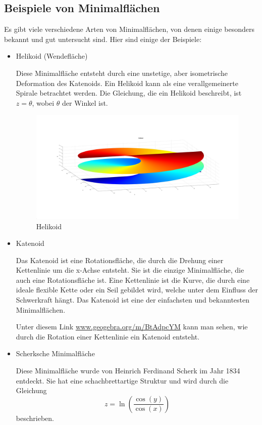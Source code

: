 \subsection{Beispiele von Minimalflächen
	\label{minimalflaechen:subsection:Beispiele von Minimalflächen}}
Es gibt viele verschiedene Arten von Minimalflächen, von denen einige besonders bekannt und gut untersucht sind.
Hier sind einige der Beispiele:
\begin{itemize}
	\item
	Helikoid (Wendefläche)
	
	Diese Minimalfläche entsteht durch eine unstetige, aber isometrische Deformation des Katenoids.
	Ein Helikoid kann als eine verallgemeinerte Spirale betrachtet werden.
	Die Gleichung, die ein Helikoid beschreibt, ist $z=\theta$, wobei $\theta$ der Winkel ist.
	
\begin{figure}
	\centering
	\includegraphics[width=0.7\linewidth]{papers/minimalflaechen/Helikoid}
	\caption{Helikoid}
	\label{fig:helikoid}
\end{figure}

	\item
	Katenoid
	
	Das Katenoid ist eine Rotationsfläche, die durch die Drehung einer Kettenlinie um die x-Achse entsteht.
	Sie ist die einzige Minimalfläche, die auch eine Rotationsfläche ist.
	Eine Kettenlinie ist die Kurve, die durch eine ideale flexible Kette oder ein Seil gebildet wird, welche unter dem Einfluss der Schwerkraft hängt.
	Das Katenoid ist eine der einfachsten und bekanntesten Minimalflächen.
	
	Unter diesem Link \href{https://www.geogebra.org/m/BtAdpcYM}{www.geogebra.org/m/BtAdpcYM} kann man sehen, wie durch die Rotation einer Kettenlinie ein Katenoid entsteht.
	\item
	Scherksche Minimalfläche
	
	Diese Minimalfläche wurde von Heinrich Ferdinand Scherk im Jahr 1834 entdeckt.
	Sie hat eine schachbrettartige Struktur und wird durch die Gleichung 
	\begin{equation}
		z=\ln(\frac{\cos(y)}{\cos(x)}) 
	\end{equation}
	beschrieben.


\end{itemize}
